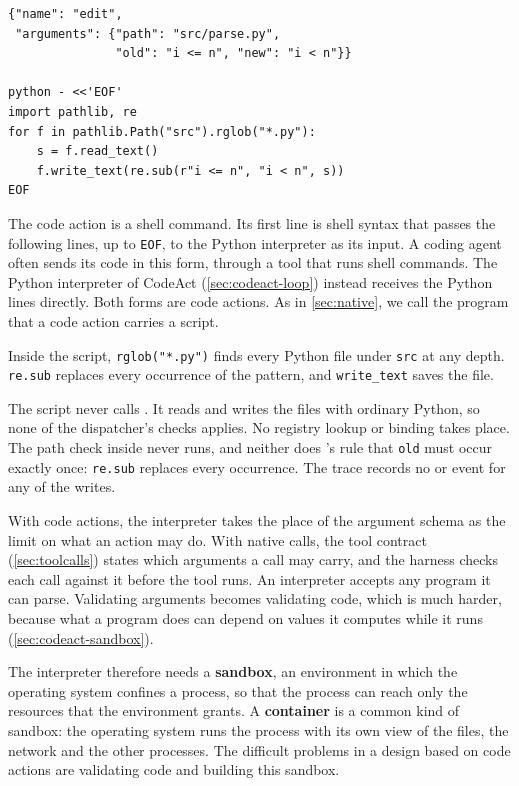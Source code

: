 \begin{lstlisting}[float=tbp, basicstyle=\ttfamily\footnotesize, columns=fixed, basewidth=0.525em, caption={Illustrative actions for the task of replacing \texttt{i <= n} with \texttt{i < n}. Above, a JSON action that edits one file. Below, a code action, sent as a shell command, that edits every matching file.}, label=lst:codeact-actions]
{"name": "edit",
 "arguments": {"path": "src/parse.py",
               "old": "i <= n", "new": "i < n"}}

python - <<'EOF'
import pathlib, re
for f in pathlib.Path("src").rglob("*.py"):
    s = f.read_text()
    f.write_text(re.sub(r"i <= n", "i < n", s))
EOF
\end{lstlisting}

The code action is a shell command. Its first line is shell syntax that passes the following
lines, up to \texttt{EOF}, to the Python interpreter as its input. A coding agent often sends its
code in this form, through a tool that runs shell commands. The Python interpreter of CodeAct
(\cref{sec:codeact-loop}) instead receives the Python lines directly. Both forms are code actions.
As in \cref{sec:native}, we call the program that a code action carries a script.

Inside the script, \texttt{rglob("*.py")} finds every Python file under \texttt{src} at any depth.
\texttt{re.sub} replaces every occurrence of the pattern, and \texttt{write\_text} saves the file.

The script never calls . It reads and writes the files with ordinary Python, so none
of the dispatcher's checks applies. No registry lookup or binding takes place. The path check
inside  never runs, and neither does 's rule that \texttt{old} must
occur exactly once: \texttt{re.sub} replaces every occurrence. The trace records no
 or  event for any of the writes.

With code actions, the interpreter takes the place of the argument schema as the limit on what an
action may do. With native calls, the tool contract (\cref{sec:toolcalls}) states which arguments a
call may carry, and the harness checks each call against it before the tool runs. An interpreter
accepts any program it can parse. Validating arguments becomes validating code, which is much
harder, because what a program does can depend on values it computes while it runs
(\cref{sec:codeact-sandbox}).

The interpreter therefore needs a \textbf{sandbox}, an environment in which the operating system
confines a process, so that the process can reach only the resources that the environment grants.
A \textbf{container} is a common kind of sandbox: the operating system runs the process with its
own view of the files, the network and the other processes. The difficult problems in a design
based on code actions are validating code and building this sandbox.

